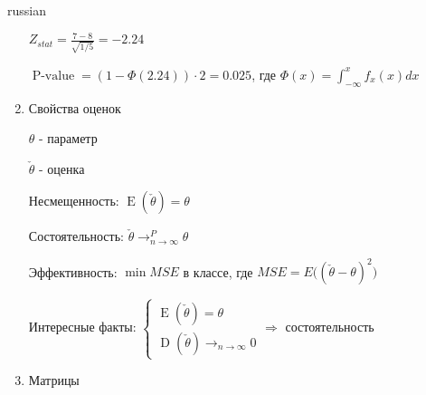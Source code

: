 \documentclass{article}
\begin{document}
\begin{otherlanguage*}{russian}
\begin{enumerate}
$Z_{stat} = \frac{7-8}{\sqrt{1 / 5}} = - 2.24$ 

$\operatorname{P-value} = (1 - \Phi (2.24)) \cdot 2 = 0.025$, где $\Phi(x) = \int_{-\infty}^x f_x(x) dx$

\item Свойства оценок 

$\theta$ - параметр

$\check{\theta}$ - оценка

Несмещенность: $\operatorname{E} (\check{\theta}) = \theta $

Состоятельность: $\check{\theta} \rightarrow^P_{n \rightarrow \infty} \theta $

Эффективность: $\min MSE $ в классе, где $MSE = E \big( (\check{\theta} - \theta) ^ 2 \big)$

Интересные факты:
$
\begin{cases}
\operatorname{E} (\check{\theta}) = \theta \\ \operatorname{D} (\check{\theta}) \rightarrow_{n \rightarrow \infty} 0
\end{cases} \Rightarrow$ состоятельность

\item Матрицы


\end{enumerate}
\end{otherlanguage*}
\end{document}
